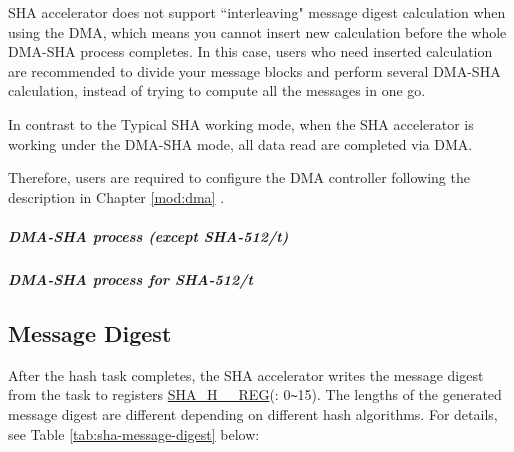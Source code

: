 \documentclass[main\_\_EN.tex]{subfiles}
\begin{document}
\chipname{} SHA accelerator does not support ``interleaving" message digest calculation when using the DMA, which means you cannot insert new calculation before the whole DMA-SHA process completes. In this case, users who need inserted calculation are recommended to divide your message blocks and perform several DMA-SHA calculation, instead of trying to compute all the messages in one go.

In contrast to the Typical SHA working mode, when the SHA accelerator is working under the DMA-SHA mode, all data read are completed via DMA.

Therefore, users are required to configure the DMA controller following the description in Chapter \ref{mod:dma} \textit{}.

\subparagraph{DMA-SHA process (except SHA-512/{\it{t}})}

    

\subparagraph{DMA-SHA process for SHA-512/{\it{t}}}

    



\subsection{Message Digest}

After the hash task completes, the SHA accelerator writes the message digest from the task to registers \hyperref[regdesc:SHAHNREG]{SHA\_H\_\_REG}(: 0\verb+~+15). The lengths of the generated message digest are different depending on different hash algorithms. For details, see Table \ref{tab:sha-message-digest} below:
\end{document}
